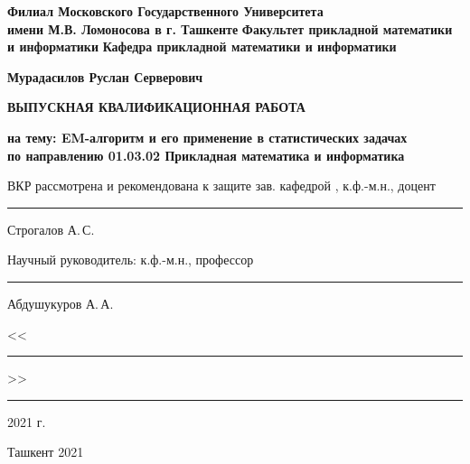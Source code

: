 \begin{titlepage}
\begin{center}
        
\textbf{Филиал Московского Государственного Университета\\
имени М.В. Ломоносова в г. Ташкенте} \vskip 0.3cm
\textbf{Факультет прикладной математики и информатики} \vskip 0.3cm
\textbf{Кафедра прикладной математики и информатики} \vskip 3cm
            
\textbf{Мурадасилов Руслан Серверович} \vskip 1cm
            
\textbf{ВЫПУСКНАЯ КВАЛИФИКАЦИОННАЯ РАБОТА} \vskip 1cm
            
\normalsize { \textbf{на тему: \guillemotleft EM-алгоритм и его применение в статистических задачах\guillemotright \\ \vskip 0.5cm
по направлению 01.03.02 \guillemotleft Прикладная математика и информатика\guillemotright} }
\vskip 1.5cm
\end{center}

\begin{flushleft}
ВКР рассмотрена и рекомендована к защите \vskip 5pt
зав. кафедрой \guillemotright, к.ф.-м.н., доцент\rule{3.2cm}{0.5pt} Строгалов А.\,С.
\end{flushleft}
\begin{flushleft}
Научный руководитель:\vskip 5pt
к.ф.-м.н., профессор \rule{6.9cm}{0.5pt} Абдушукуров А.\,А.
\end{flushleft}
          
\begin{flushright}
<<\rule{1cm}{0.5pt}>>\rule{3.5cm}{0.5pt} 2021 г.
\end{flushright}
        
\vfill   
\begin{center}
Ташкент 2021
\end{center}
\end{titlepage}